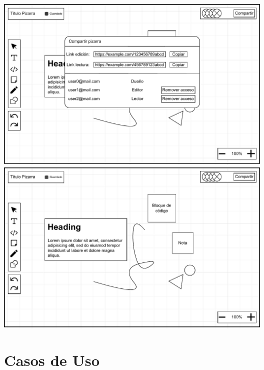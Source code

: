 \documentclass[a4paper, oneside, final]{scrartcl}
\begin{document}
\includegraphics[width= \textwidth]{images/WireframePizarra-Ventana-compartir-pizarra.drawio.pdf}
\includegraphics[width= \textwidth]{images/WireframePizarra.drawio.pdf}


\clearpage

\section{Casos de Uso}
\end{document}

